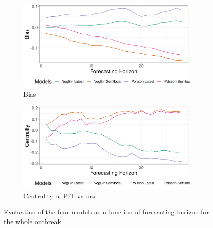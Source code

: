 \documentclass[12pt]{article}
\begin{document}
\begin{figure}[h!]
\begin{subfigure}{0.5\textwidth}
  \centering
  \includegraphics[width=\linewidth]{../output/national_bias.png}  
  \caption{Bias}
  \label{fig:sub-third}
\end{subfigure}
\begin{subfigure}{0.5\textwidth}
  \centering
  \includegraphics[width=\linewidth]{../output/national_centrality.png}  
  \caption{Centrality of PIT values}
  \label{fig:nat_scores_4}
\end{subfigure}
  \caption{Evaluation of the four models as a function of forecasting horizon for the whole outbreak}

  \label{fig:nat_scores}
\end{figure}
\end{document}
